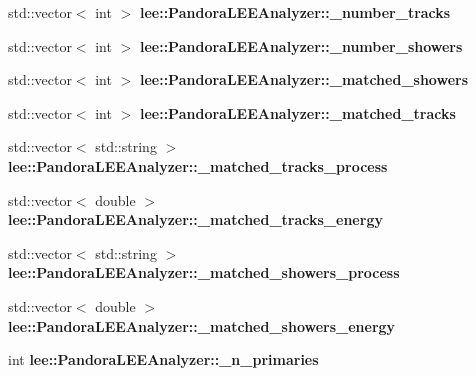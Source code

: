 \begin{DoxyCompactItemize}
\item 
\hypertarget{group__lee_ga413d54bca989124f2aaec5837c930a22}{std\-::vector$<$ int $>$ {\bfseries lee\-::\-Pandora\-L\-E\-E\-Analyzer\-::\-\_\-number\-\_\-tracks}}\label{group__lee_ga413d54bca989124f2aaec5837c930a22}

\item 
\hypertarget{group__lee_ga636e7f5eece11bbd0d0188ea073c1ee5}{std\-::vector$<$ int $>$ {\bfseries lee\-::\-Pandora\-L\-E\-E\-Analyzer\-::\-\_\-number\-\_\-showers}}\label{group__lee_ga636e7f5eece11bbd0d0188ea073c1ee5}

\item 
\hypertarget{group__lee_ga51ecdfb466b876fde01072e95408bedb}{std\-::vector$<$ int $>$ {\bfseries lee\-::\-Pandora\-L\-E\-E\-Analyzer\-::\-\_\-matched\-\_\-showers}}\label{group__lee_ga51ecdfb466b876fde01072e95408bedb}

\item 
\hypertarget{group__lee_ga31e3e0db2ea3526c148ab1d98cd3b35c}{std\-::vector$<$ int $>$ {\bfseries lee\-::\-Pandora\-L\-E\-E\-Analyzer\-::\-\_\-matched\-\_\-tracks}}\label{group__lee_ga31e3e0db2ea3526c148ab1d98cd3b35c}

\item 
\hypertarget{group__lee_gaf01f5331ecedef37034b5e8a12aac314}{std\-::vector$<$ std\-::string $>$ {\bfseries lee\-::\-Pandora\-L\-E\-E\-Analyzer\-::\-\_\-matched\-\_\-tracks\-\_\-process}}\label{group__lee_gaf01f5331ecedef37034b5e8a12aac314}

\item 
\hypertarget{group__lee_ga3cd167b0e0e259df8c58bed1190edd85}{std\-::vector$<$ double $>$ {\bfseries lee\-::\-Pandora\-L\-E\-E\-Analyzer\-::\-\_\-matched\-\_\-tracks\-\_\-energy}}\label{group__lee_ga3cd167b0e0e259df8c58bed1190edd85}

\item 
\hypertarget{group__lee_ga68fdfb9878716c7d99651a98e294818d}{std\-::vector$<$ std\-::string $>$ {\bfseries lee\-::\-Pandora\-L\-E\-E\-Analyzer\-::\-\_\-matched\-\_\-showers\-\_\-process}}\label{group__lee_ga68fdfb9878716c7d99651a98e294818d}

\item 
\hypertarget{group__lee_ga8c616d054941206de6a91e7859ac4209}{std\-::vector$<$ double $>$ {\bfseries lee\-::\-Pandora\-L\-E\-E\-Analyzer\-::\-\_\-matched\-\_\-showers\-\_\-energy}}\label{group__lee_ga8c616d054941206de6a91e7859ac4209}

\item 
\hypertarget{group__lee_ga9cb9605f2fe0af2464f936651659ad91}{int {\bfseries lee\-::\-Pandora\-L\-E\-E\-Analyzer\-::\-\_\-n\-\_\-primaries}}\label{group__lee_ga9cb9605f2fe0af2464f936651659ad91}


\end{DoxyCompactItemize}
